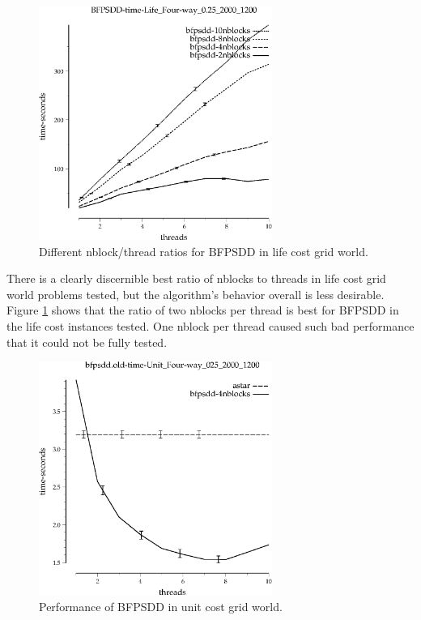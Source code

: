 \documentclass{article}
\begin{document}
\begin{figure}[h!]
\includegraphics[width=3in]{../graphs/grid_life_four-way_0.25_2000_1200/BFPSDD-time-Life_Four-way_0.25_2000_1200.eps}
\caption{Different nblock/thread ratios for BFPSDD in life cost grid world.}
\label{fig:BFPSDD-nblock-life}
\end{figure}

There is a clearly discernible best ratio of nblocks to threads in life cost grid world problems tested, but the algorithm's behavior overall is less desirable. Figure \ref{fig:BFPSDD-nblock-life} shows that the ratio of two nblocks per thread is best for BFPSDD in the life cost instances tested. One nblock per thread caused such bad performance that it could not be fully tested.

\begin{figure}[h!]
\includegraphics[width=3in]{../graphs/seth/grid-unit-single/BFPSDD.eps}
\caption{Performance of BFPSDD in unit cost grid world.}
\label{fig:BFPSDD-grid}
\end{figure}
\end{document}
